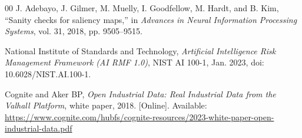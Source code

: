 \documentclass[conference]{IEEEtran}
\begin{document}
\begin{thebibliography}{00}
 J. Adebayo, J. Gilmer, M. Muelly, I. Goodfellow, M. Hardt, and B. Kim, ``Sanity checks for saliency maps,'' in \emph{Advances in Neural Information Processing Systems}, vol. 31, 2018, pp. 9505--9515.

 National Institute of Standards and Technology, \emph{Artificial Intelligence Risk Management Framework (AI RMF 1.0)}, NIST AI 100-1, Jan. 2023, doi: 10.6028/NIST.AI.100-1.

 Cognite and Aker BP, \emph{Open Industrial Data: Real Industrial Data from the Valhall Platform}, white paper, 2018. [Online]. Available: \url{https://www.cognite.com/hubfs/cognite-resources/2023-white-paper-open-industrial-data.pdf}
\end{thebibliography}
\end{document}

